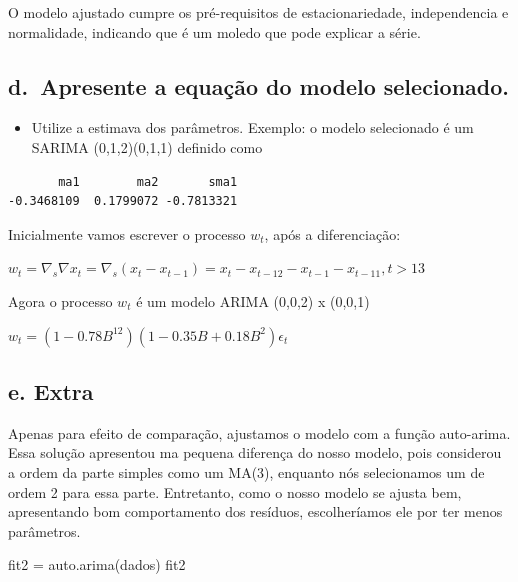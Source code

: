 \documentclass[
  letterpaper,
  DIV=11,
  numbers=noendperiod]{scrartcl}
\newenvironment{Shaded}{\begin{snugshade}}{\end{snugshade}}
\newcommand{\FunctionTok}[1]{\textcolor[rgb]{0.28,0.35,0.67}{#1}}
\newcommand{\NormalTok}[1]{\textcolor[rgb]{0.00,0.23,0.31}{#1}}
\newcommand{\OtherTok}[1]{\textcolor[rgb]{0.00,0.23,0.31}{#1}}
\newcommand{\SpecialCharTok}[1]{\textcolor[rgb]{0.37,0.37,0.37}{#1}}
\providecommand{\tightlist}{%
  \setlength{\itemsep}{0pt}\setlength{\parskip}{0pt}}\usepackage{longtable,booktabs,array}
\begin{document}
O modelo ajustado cumpre os pré-requisitos de estacionariedade,
independencia e normalidade, indicando que é um moledo que pode explicar
a série.

\hypertarget{d.-apresente-a-equauxe7uxe3o-do-modelo-selecionado.}{%
\subsection{d.~Apresente a equação do modelo
selecionado.}\label{d.-apresente-a-equauxe7uxe3o-do-modelo-selecionado.}}

\begin{itemize}
\tightlist
\item
  Utilize a estimava dos parâmetros. Exemplo: o modelo selecionado é um
  SARIMA (0,1,2)(0,1,1) definido como
\end{itemize}

\begin{Shaded}
\end{Shaded}

\begin{verbatim}
       ma1        ma2       sma1 
-0.3468109  0.1799072 -0.7813321 
\end{verbatim}

Inicialmente vamos escrever o processo \(w_t\), após a diferenciação:

\(w_t = \nabla_s\nabla x_t = \nabla_s(x_t - x_{t-1}) = x_t - x_{t-12} - x_{t-1} - x_{t-11} , t > 13\)

Agora o processo \(w_t\) é um modelo ARIMA (0,0,2) x (0,0,1)

\(w_t =(1-0.78B^{12})(1 -0.35B + 0.18B^2)\epsilon_t\)

\hypertarget{e.-extra}{%
\subsection{e. Extra}\label{e.-extra}}

Apenas para efeito de comparação, ajustamos o modelo com a função
auto-arima. Essa solução apresentou ma pequena diferença do nosso
modelo, pois considerou a ordem da parte simples como um MA(3), enquanto
nós selecionamos um de ordem 2 para essa parte. Entretanto, como o nosso
modelo se ajusta bem, apresentando bom comportamento dos resíduos,
escolheríamos ele por ter menos parâmetros.

\begin{Shaded}
\begin{Highlighting}[]
\NormalTok{fit2 }\OtherTok{=} \FunctionTok{auto.arima}\NormalTok{(dados)}
\NormalTok{fit2}
\end{Highlighting}
\end{Shaded}
\end{document}
